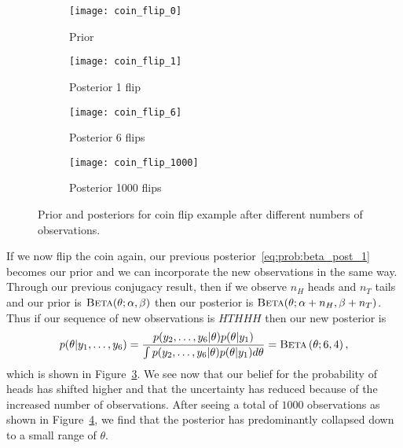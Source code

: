 \begin{figure}[t]
	\centering
	\begin{subfigure}[t]{0.24\textwidth}
		\texttt{[image: coin\_flip\_0]}
		\caption{Prior \label{fig:inf:coin_flip:0}}
	\end{subfigure}
	\begin{subfigure}[t]{0.24\textwidth}
		\texttt{[image: coin\_flip\_1]}
		\caption{Posterior 1 flip \label{fig:inf:coin_flip:1}}
	\end{subfigure}
	\begin{subfigure}[t]{0.24\textwidth}
		\texttt{[image: coin\_flip\_6]}
		\caption{Posterior 6 flips \label{fig:inf:coin_flip:6}}
	\end{subfigure}
	\begin{subfigure}[t]{0.24\textwidth}
		\texttt{[image: coin\_flip\_1000]}
		\caption{Posterior 1000 flips \label{fig:inf:coin_flip:1000}}
	\end{subfigure}
	\caption{Prior and posteriors for coin flip example after different numbers
		of observations. \vspace{-5pt}
		\label{fig:inf:coin_flip}}
\end{figure}

If we now flip the coin again, our previous posterior~\eqref{eq:prob:beta_post_1} becomes our
prior and we can incorporate the new observations in the same way.  
Through our previous conjugacy result, then if we observe $n_{H}$ heads
and $n_{T}$ tails and our prior is $\textsc{Beta}(\theta ; \alpha, \beta)$ then our posterior is
$\textsc{Beta}(\theta ; \alpha+n_H, \beta+n_T)$.
Thus if our sequence of new
observations is $HTHHH$ then our new posterior is
\begin{align}
p(\theta | y_1,\dots,y_6) = \frac{p(y_2,\dots,y_6 | \theta)p(\theta | y_1)}
{\int p(y_2,\dots,y_6 | \theta)p(\theta | y_1) d\theta} = \textsc{Beta}\left(\theta ; 6,4\right),
\end{align}
which is shown in Figure~\ref{fig:inf:coin_flip:6}.  We see now that our belief for the probability of heads
has shifted higher and that the uncertainty has reduced because of the increased number
of observations.
After seeing a total of $1000$ observations as shown in Figure~\ref{fig:inf:coin_flip:1000}, we
find that the posterior has predominantly collapsed down to a small range of $\theta$.

